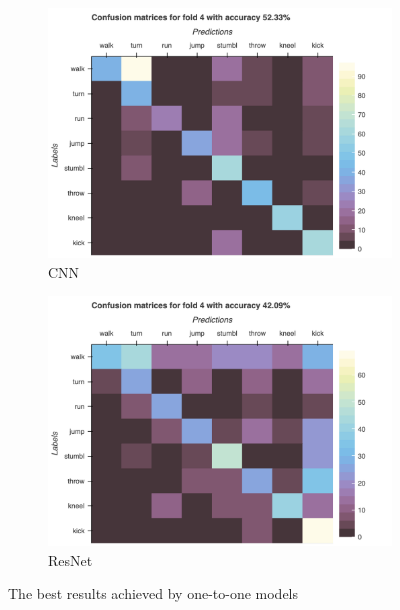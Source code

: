 		\begin{figure}[H]\ContinuedFloat
			\begin{subfigure}[b]{0.49\textwidth}
				\centering
				\includegraphics[width=\textwidth]{img/CNN-confusion_matrix.png}
				\caption{CNN}
			\end{subfigure}
			\hfill
			\begin{subfigure}[b]{0.49\textwidth}
				\centering
				\includegraphics[width=\textwidth]{img/ResNet-confusion_matrix.png}
				\caption{ResNet}
			\end{subfigure}
			\caption{The best results achieved by one-to-one models}
			\label{fig:confusion-raw}
		\end{figure}
